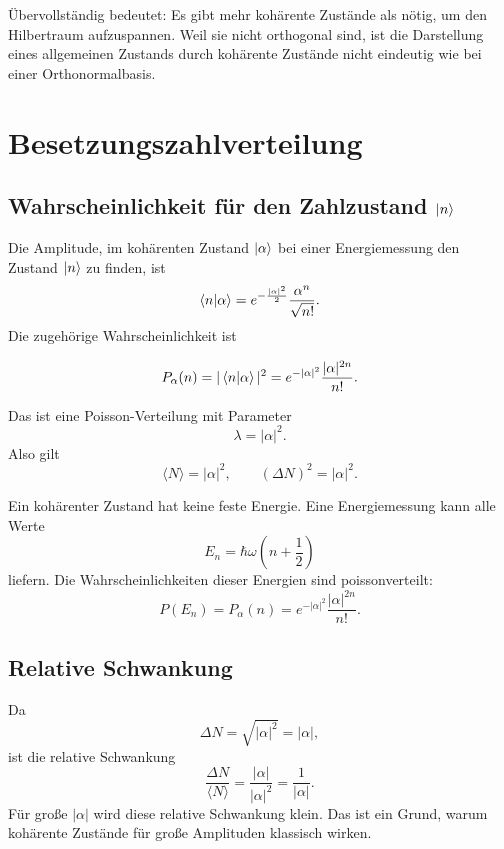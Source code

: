 \begin{notebox}
Übervollständig bedeutet: Es gibt mehr kohärente Zustände als nötig, um den Hilbertraum aufzuspannen. Weil sie nicht orthogonal sind, ist die Darstellung eines allgemeinen Zustands durch kohärente Zustände nicht eindeutig wie bei einer Orthonormalbasis.
\end{notebox}

\section{Besetzungszahlverteilung}

\subsection{Wahrscheinlichkeit für den Zahlzustand \texorpdfstring{\(\left|n\right\rangle\)}{|n>}}

Die Amplitude, im kohärenten Zustand \(\left|\alpha\right\rangle\) bei einer Energiemessung den Zustand \(\left|n\right\rangle\) zu finden, ist
\[
    \left\langle n\middle|\alpha\right\rangle=e^{-\frac{|\alpha|^2}{2}}\frac{\alpha^n}{\sqrt{n!}}.
\]
Die zugehörige Wahrscheinlichkeit ist
\begin{formulabox}
\[
    P_\alpha(n)=|\left\langle n\middle|\alpha\right\rangle|^2
    =e^{-|\alpha|^2}\frac{|\alpha|^{2n}}{n!}.
\]
\end{formulabox}

Das ist eine Poisson-Verteilung mit Parameter
\[
    \lambda=|\alpha|^2.
\]
Also gilt
\[
    \langle N\rangle=|\alpha|^2,
    \qquad
    (\Delta N)^2=|\alpha|^2.
\]

\begin{conceptbox}
Ein kohärenter Zustand hat keine feste Energie. Eine Energiemessung kann alle Werte
\[
    E_n=\hbar\omega\left(n+\frac12\right)
\]
liefern. Die Wahrscheinlichkeiten dieser Energien sind poissonverteilt:
\[
    P(E_n)=P_\alpha(n)=e^{-|\alpha|^2}\frac{|\alpha|^{2n}}{n!}.
\]
\end{conceptbox}

\subsection{Relative Schwankung}

Da
\[
    \Delta N=\sqrt{|\alpha|^2}=|\alpha|,
\]
ist die relative Schwankung
\[
    \frac{\Delta N}{\langle N\rangle}=\frac{|\alpha|}{|\alpha|^2}=\frac{1}{|\alpha|}.
\]
Für große \(|\alpha|\) wird diese relative Schwankung klein. Das ist ein Grund, warum kohärente Zustände für große Amplituden klassisch wirken.

